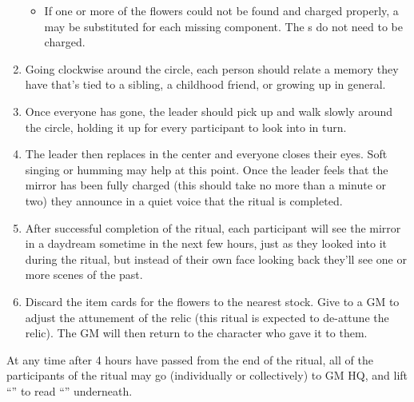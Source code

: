 \documentclass[green]{GL2020}
\begin{document}
\begin{enumerate}
  \begin{itemize}
  \item If one or more of the flowers could not be found and charged properly, a \iStoneFlower{} may be substituted for each missing component. The \iStoneFlower{}s do not need to be charged.
  \end{itemize}
  \item Going clockwise around the circle, each person should relate a memory they have that's tied to a sibling, a childhood friend, or growing up in general.
  \item Once everyone has gone, the leader should pick up \iMirror{} and walk slowly around the circle, holding it up for every participant to look into in turn.
  \item The leader then replaces \iMirror{} in the center and everyone closes their eyes. Soft singing or humming may help at this point. Once the leader feels that the mirror has been fully charged (this should take no more than a minute or two) they announce in a quiet voice that the ritual is completed.
  \item After successful completion of the ritual, each participant  will see the mirror in a daydream sometime in the next few hours, just as they looked into it during the ritual, but instead of their own face looking back they'll see one or more scenes of the past.
  \item Discard the item cards for the flowers to the nearest stock. Give \iMirror{} to a GM to adjust the attunement of the relic (this ritual is expected to de-attune the relic). The GM will then return \iMirror{} to the character who gave it to them.
\end{enumerate}

At any time after 4 hours have passed from the end of the ritual, all of the participants of the ritual may go (individually or collectively) to GM HQ, and lift ``\sSignCOne{}'' to read ``\sSignCTwo{}'' underneath.
\end{document}

